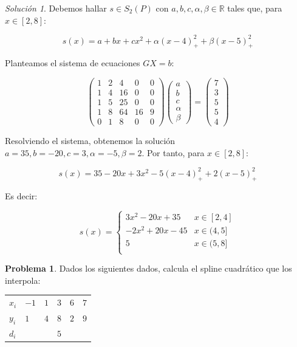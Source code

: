 \documentclass[11pt,spanish,]{article}
\theoremstyle{definition} \newtheorem*{definicion}{Definición}
\newtheorem*{problema}{Problema} \theoremstyle{remark}
\newtheorem*{solucion}{Solución}
\begin{document}
\begin{solucion}

Debemos hallar $s \in S_2(P)$ con $a,b,c, \alpha, \beta \in \mathbb{R}$ tales que, para $x \in [2,8]$:

\[ s(x)  = a + bx + cx^2 + \alpha (x - 4)^2_+ + \beta (x -5)^2_+\]

Planteamos el sistema de ecuaciones $GX = b$:

\[
\begin{pmatrix}
1 & 2 & 4  & 0  & 0\\
1 & 4 & 16 & 0  & 0\\
1 & 5 & 25 & 0  & 0\\
1 & 8 & 64 & 16 & 9\\
0 & 1 &  8 & 0  & 0
\end{pmatrix}
\begin{pmatrix}
a        \\
b        \\
c        \\
\alpha \\
\beta
\end{pmatrix}
=
\begin{pmatrix}
7\\
3\\
5\\
5\\
4
\end{pmatrix}
\]

Resolviendo el sistema, obtenemos la solución $a = 35, b = -20, c = 3, \alpha = -5, \beta = 2$. Por tanto, para $x \in [2,8]$:

\[ s(x)  = 35 - 20x + 3x^2 -5(x - 4)^2_+ + 2(x -5)^2_+\]

Es decir:

\[
s(x) =
\begin{cases}
 3x^2 - 20x + 35  & x \in [2,4] \\
-2x^2 + 20x - 45 & x \in (4,5] \\
 5  & x \in (5,8] \\
\end{cases}
\]

\end{solucion}

\begin{problema}
Dados los siguientes dados, calcula el spline cuadrático que los interpola:
\begin{table}[h]
\centering
\begin{tabular}{l|lllll}
$x_i$ & $-1$& $1$ & $3$ & $6$ & $7$ \\
$y_i$ & $1$ & $4$ & $8$ & $2$ & $9$ \\
$d_i$   &     &    & $5$ &      &     \\
\end{tabular}
\end{table}
\end{problema}
\end{document}
